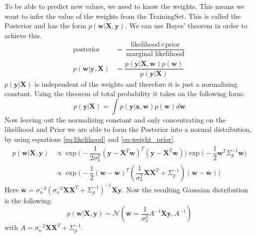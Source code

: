 To be able to predict new values, we need to know the weights. This means we want to infer the value of the weights from the \gls{TrainingSet}. This is called the \gls{Posterior} and has the form $p(\mathbf{w}|\mathbf{X},\mathbf{y})$. We can use Bayes' theorem in order to achieve this.
\begin{equation}\label{eq:bayestheorem}
\begin{aligned}
\text{posterior} &= \dfrac{\text{likelihood} \times \text{prior}}{\text{marginal likelihood}}\\
p(\mathbf{w}|\mathbf{y},\mathbf{X}) &= \dfrac{p(\mathbf{y}|\mathbf{X},\mathbf{w})p(\mathbf{w})}{p(\mathbf{y}|\mathbf{X})}
\end{aligned}
\end{equation}
$p(\mathbf{y}|\mathbf{X})$ is independent of the weights and therefore it is just a normalizing constant. Using the theorem of total probability it takes on the following form:
\begin{equation}\label{eq:nc_tp}
p(\mathbf{y}|\mathbf{X}) = \int p(\mathbf{y}|\mathbf{x},\mathbf{w})p(\mathbf{w})d\mathbf{w}
\end{equation}
Now leaving out the normalizing constant and only concentrating on the likelihood and \gls{Prior} we are able to form the \gls{Posterior} into a normal distribution, by using equations \ref{eq:likelihood} and \ref{eq:weight_prior}.
\begin{equation}\label{eq:posterior_distri}
\begin{aligned}
p(\mathbf{w}|\mathbf{X},\mathbf{y}) &\propto \exp\big(-\dfrac{1}{2\sigma_n^2}(\mathbf{y}-\mathbf{X}^T\mathbf{w})^T(\mathbf{y}-\mathbf{X}^T\mathbf{w})\big)\exp \big(-\dfrac{1}{2}\mathbf{w}^T\Sigma_p^{-1}\mathbf{w}\big)\\
&\propto \exp \big(-\dfrac{1}{2}(\mathbf{w}-\bar{\mathbf{w}})^T(\dfrac{1}{\sigma_n^2}\mathbf{X}\mathbf{X}^T+\Sigma_p^{-1})(\mathbf{w}-\bar{\mathbf{w}})\big)
\end{aligned}
\end{equation}
Here $\bar{\mathbf{w}} = \sigma_n^{-2}(\sigma_n^{-2}\mathbf{X}\mathbf{X}^T+\Sigma_p^{-1})^{-1}\mathbf{X}\mathbf{y}$. Now the resulting Gaussian distribution is the following:
\begin{equation}\label{eq:posterior_gauss}
p(\mathbf{w}|\mathbf{X},\mathbf{y}) \sim \mathcal{N}(\bar{\mathbf{w}}=\dfrac{1}{\sigma_n^2}A^{-1}\mathbf{X}\mathbf{y},A^{-1})
\end{equation}
with $A = \sigma_n^{-2}\mathbf{X}\mathbf{X}^T + \Sigma_p^{-1}$\citep[p. 9]{Rasmussen:2005:GPM:1162254}.

